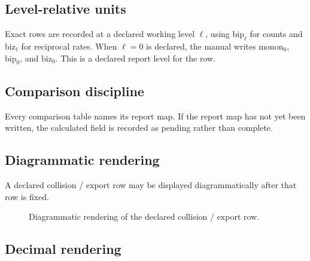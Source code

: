 \subsection{Level-relative units}
\label{man:level-relative-units}

Exact rows are recorded at a declared working level \(\ell\), using \(\mathrm{bip}_{\ell}\) for counts and \(\mathrm{biz}_{\ell}\) for reciprocal rates. When \(\ell=0\) is declared, the manual writes \(\mathrm{monon}_0\), \(\mathrm{bip}_0\), and \(\mathrm{biz}_0\). This is a declared report level for the row.

\subsection{Comparison discipline}
\label{man:comparison-discipline}

Every comparison table names its report map. If the report map has not yet been written, the calculated field is recorded as pending rather than complete.

\subsection{Diagrammatic rendering}
\label{man:diagrammatic-temporal-rendering}

A declared collision / export row may be displayed diagrammatically after that row is fixed.

\begin{figure}[H]
\centering
{}
\caption{Diagrammatic rendering of the declared collision / export row.}
\label{fig:manual-collision-export-rendering}
\end{figure}

\subsection{Decimal rendering}
\label{man:decimal-rendering}

